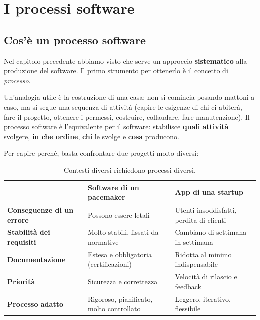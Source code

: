 \chapter{I processi software}

\section{Cos'è un processo software}

Nel capitolo precedente abbiamo visto che serve un approccio \textbf{sistematico} alla produzione del software.
Il primo strumento per ottenerlo è il concetto di \textit{processo}.


Un'analogia utile è la costruzione di una casa: non si comincia posando mattoni a caso, ma si segue una sequenza
di attività (capire le esigenze di chi ci abiterà, fare il progetto, ottenere i permessi, costruire, collaudare, fare manutenzione).
Il processo software è l'equivalente per il software: stabilisce \textbf{quali attività} svolgere, \textbf{in che ordine},
\textbf{chi} le svolge e \textbf{cosa} producono.


Per capire perché, basta confrontare due progetti molto diversi:

\begin{table}[H]
\centering
\renewcommand{\arraystretch}{1.4}
\begin{tabularx}{\textwidth}{>{\bfseries}P{4cm} L L}
\toprule
 & \textcolor{swred}{Software di un pacemaker} & \textcolor{swblue}{App di una startup} \\
\midrule
Conseguenze di un errore & Possono essere letali & Utenti insoddisfatti, perdita di clienti \\
Stabilità dei requisiti & Molto stabili, fissati da normative & Cambiano di settimana in settimana \\
Documentazione & Estesa e obbligatoria (certificazioni) & Ridotta al minimo indispensabile \\
Priorità & Sicurezza e correttezza & Velocità di rilascio e feedback \\
Processo adatto & Rigoroso, pianificato, molto controllato & Leggero, iterativo, flessibile \\
\bottomrule
\end{tabularx}
\caption{Contesti diversi richiedono processi diversi.}
\end{table}

